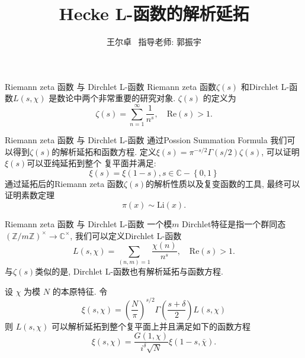 \documentclass[aspectratio=169]{beamer}
\title{Hecke L-函数的解析延拓}
\author{王尔卓 \, \newline 指导老师: 郭振宇}
\theoremstyle{definition}
\newcommand{\bbrace}[1]{\left\{ #1 \right\} }
\newcommand{\bb}[1]{\mathbb{#1}}
\begin{document}
\begin{frame}
    \titlepage
\end{frame}
\begin{frame}{Riemann zeta 函数 与 Dirchlet L-函数}
    Riemann zeta 函数$\zeta(s)$ 和Dirchlet L-函数$L(s,\chi)$ 是数论中两个非常重要的研究对象. 
    $\zeta(s)$ 的定义为
    \begin{equation*}
        \zeta(s)=\sum_{n=1}^{\infty}\frac{1}{n^s}, \quad \text{Re}(s)>1.  
    \end{equation*}
 
\end{frame}
\begin{frame}{Riemann zeta 函数 与 Dirchlet L-函数} 
    通过Possion Summation Formula 我们可以得到$\zeta(s)$的解析延拓和函数方程.
    定义$\xi(s)=\pi^{-s/2}\Gamma(s/2)\zeta(s)$, 可以证明$\xi(s)$可以亚纯延拓到整个
    复平面并满足: 
    \begin{equation*}
        \xi(s)=\xi(1-s), s\in\bb{C}-\bbrace{0,1}
    \end{equation*}
通过延拓后的Riemann zeta 函数$\zeta(s)$的解析性质以及复变函数的工具,  
最终可以证明素数定理
\begin{equation*}
    \pi(x)\sim \text{Li}(x).
\end{equation*}

\end{frame}
\begin{frame}{Riemann zeta 函数 与 Dirchlet L-函数}
    一个模$m$ Dirchlet特征是指一个群同态 $(\bb{Z}/m\bb{Z})^\times \rightarrow \bb{C}^\times$, 
    我们可以定义Dirchlet L-函数 
    \begin{equation*}
        L(s,\chi)=\sum_{(n,m)=1}\frac{\chi(n)}{n^s}, \quad \text{Re}(s)>1.  
    \end{equation*} 
    与$\zeta(s)$类似的是, Dirchlet L-函数也有解析延拓与函数方程.
    
    设 $\chi$ 为模 $N$ 的本原特征. 令
    \begin{equation*}
        \xi(s, \chi)=\left(\frac{N}{\pi}\right)^{s / 2} \Gamma\left(\frac{s+\delta}{2}\right) L(s, \chi)
    \end{equation*}
        则 $L(s, \chi)$ 可以解析延拓到整个复平面上并且满足如下的函数方程 
        $$
        \xi(s, \chi)=\frac{G(1, \chi)}{i^\delta \sqrt{N}} \xi(1-s, \bar{\chi}) .
        $$
\end{frame}
\end{document}
